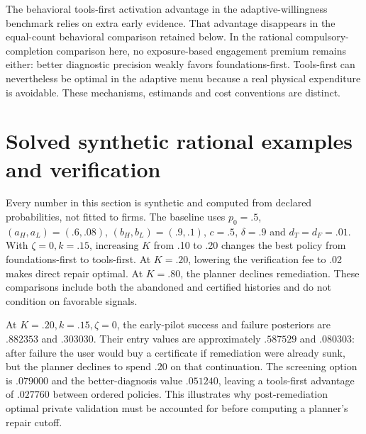 The behavioral tools-first activation advantage in the adaptive-willingness benchmark relies on extra early evidence. That advantage disappears in the equal-count behavioral comparison retained below. In the rational compulsory-completion comparison here, no exposure-based engagement premium remains either: better diagnostic precision weakly favors foundations-first. Tools-first can nevertheless be optimal in the adaptive menu because a real physical expenditure is avoidable. These mechanisms, estimands and cost conventions are distinct.



\section{Solved synthetic rational examples and verification}\label{sec:rationalnumbers}
Every number in this section is synthetic and computed from declared probabilities, not fitted to firms. The baseline uses $p_0=.5$, $(a_H,a_L)=(.6,.08)$, $(b_H,b_L)=(.9,.1)$, $c=.5$, $\delta=.9$ and $d_T=d_F=.01$. With $\zeta=0,k=.15$, increasing $K$ from .10 to .20 changes the best policy from foundations-first to tools-first. At $K=.20$, lowering the verification fee to .02 makes direct repair optimal. At $K=.80$, the planner declines remediation. These comparisons include both the abandoned and certified histories and do not condition on favorable signals.



At $K=.20,k=.15,\zeta=0$, the early-pilot success and failure posteriors are $.882353$ and $.303030$. Their entry values are approximately $.587529$ and $.080303$: after failure the user would buy a certificate if remediation were already sunk, but the planner declines to spend $.20$ on that continuation. The screening option is $.079000$ and the better-diagnosis value $.051240$, leaving a tools-first advantage of $.027760$ between ordered policies. This illustrates why post-remediation optimal private validation must be accounted for before computing a planner's repair cutoff.

